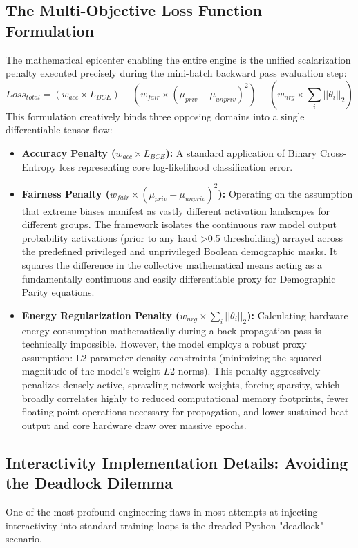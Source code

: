 \documentclass[12pt,a4paper]{article}
\begin{document}
\subsection{The Multi-Objective Loss Function Formulation}
The mathematical epicenter enabling the entire engine is the unified scalarization penalty executed precisely during the mini-batch backward pass evaluation step:
\begin{equation}
    Loss_{total} = (w_{acc} \times L_{BCE}) + (w_{fair} \times (\mu_{priv} - \mu_{unpriv})^2) + (w_{nrg} \times \sum_{i}||\theta_i||_2)
\end{equation}
This formulation creatively binds three opposing domains into a single differentiable tensor flow:
\begin{itemize}
    \item \textbf{Accuracy Penalty ($w_{acc} \times L_{BCE}$):} A standard application of Binary Cross-Entropy loss representing core log-likelihood classification error.
    \item \textbf{Fairness Penalty ($w_{fair} \times (\mu_{priv} - \mu_{unpriv})^2$):} Operating on the assumption that extreme biases manifest as vastly different activation landscapes for different groups. The framework isolates the continuous raw model output probability activations (prior to any hard >0.5 thresholding) arrayed across the predefined privileged and unprivileged Boolean demographic masks. It squares the difference in the collective mathematical means acting as a fundamentally continuous and easily differentiable proxy for Demographic Parity equations.
    \item \textbf{Energy Regularization Penalty ($w_{nrg} \times \sum_{i}||\theta_i||_2$):} Calculating hardware energy consumption mathematically during a back-propagation pass is technically impossible. However, the model employs a robust proxy assumption: L2 parameter density constraints (minimizing the squared magnitude of the model's weight $L2$ norms). This penalty aggressively penalizes densely active, sprawling network weights, forcing sparsity, which broadly correlates highly to reduced computational memory footprints, fewer floating-point operations necessary for propagation, and lower sustained heat output and core hardware draw over massive epochs.
\end{itemize}

\subsection{Interactivity Implementation Details: Avoiding the Deadlock Dilemma}
One of the most profound engineering flaws in most attempts at injecting interactivity into standard training loops is the dreaded Python "deadlock" scenario. 
\end{document}
